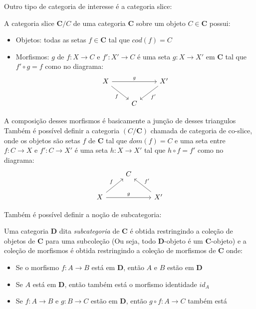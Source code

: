 \documentclass[../main.tex]{subfiles}
\begin{document}
Outro tipo de categoria de interesse é a categoria slice:

\begin{definition}
    A categoria slice $\textbf{C}/C$ de uma categoria $\textbf{C}$ sobre um objeto $C \in \textbf{C}$ possui:
    \begin{itemize}
        \item Objetos: todas as setas $f \in \textbf{C}$ tal que $cod(f) = C$
        \item Morfismos: $g$ de $f : X \to C$ e $f' : X' \to C$ é uma seta $g : X \to X'$ em $\textbf{C}$ tal que $f' \circ g = f$ como no diagrama:
        \[\begin{tikzcd}
            X && {X'} \\
            & C
            \arrow["g", from=1-1, to=1-3]
            \arrow["f"', from=1-1, to=2-2]
            \arrow["{f'}", from=1-3, to=2-2]
        \end{tikzcd}\]
    \end{itemize}
    A composição desses morfismos é basicamente a junção de desses triangulos \\

    Também é possível definir a categoria $(C / \textbf{C})$ chamada de categoria de co-slice, onde os objetos são setas $f$ de $\textbf{C}$ tal que $dom(f) = C$ e uma seta entre $f : C \to X$ e $f' : C \to X'$ é uma seta $h : X \to X'$ tal que $h \circ f = f'$ como no diagrama:
    \[\begin{tikzcd}
        & C \\
        X && {X'}
        \arrow["f", from=2-1, to=1-2]
        \arrow["g", from=2-1, to=2-3]
        \arrow["{f'}"', from=2-3, to=1-2]
    \end{tikzcd}\]
\end{definition}

Também é possível definir a noção de subcategoria:

\begin{definition}
    Uma categoria $\textbf{D}$ dita \emph{subcategoria} de $\textbf{C}$ é obtida restringindo a coleção de objetos de $\textbf{C}$ para uma subcoleção (Ou seja, todo $\textbf{D}$-objeto é um $\textbf{C}$-objeto) e a coleção de morfismos é obtida restringindo a coleção de morfismos de $\textbf{C}$ onde:
    \begin{itemize}
        \item Se o morfismo $f : A \to B$ está em $\textbf{D}$, então $A$ e $B$ estão em $\textbf{D}$
        \item Se $A$ está em $\textbf{D}$, então também está o morfismo identidade $id_A$
        \item Se $f : A \to B$ e $g : B \to C$ estão em $\textbf{D}$, então $g \circ f : A \to C$ também está
    \end{itemize}
\end{definition}
\end{document}
